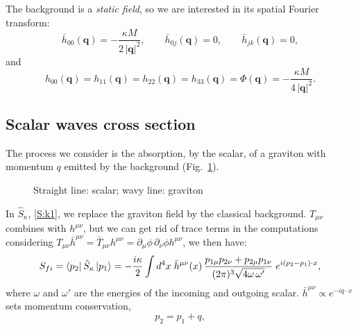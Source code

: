 \documentclass[12pt,a4paper,oneside]{article}
\numberwithin{equation}{section}   %
\begin{document}
The background is a \textit{static field}, so we are interested in its spatial
Fourier transform:
\begin{equation}
    \label{eq:epsilon}
    \bar h_{00}(\mathbf q)=-\frac{\kappa M}{2\,|\mathbf q|^{2}},\qquad
    \bar h_{0j}(\mathbf q)=0,\qquad
    \bar h_{jk}(\mathbf q)=0 ,
\end{equation}
and
\begin{equation}
  \label{eq:Phi}
  h_{00}(\mathbf q)=h_{11}(\mathbf q)=h_{22}(\mathbf q)=h_{33}(\mathbf q)
  =\Phi(\mathbf q)=-\frac{\kappa M}{4\,|\mathbf q|^2}.
\end{equation}

\subsection{Scalar waves cross section}
\label{subsec:amplitude}
The process we consider is the absorption, by the scalar, of a graviton with
momentum $q$ emitted by the background (Fig.~\ref{fig:external-field}).
\begin{figure}[H]
\centering
{}
\caption{Straight line: scalar; wavy
line: graviton}
\label{fig:external-field}
\end{figure}
In $\hat S_\kappa$, \eqref{S:k1}, we replace the graviton field by the classical
background. $T_{\mu\nu}$ combines with
$h^{\mu\nu}$, but we can get rid of trace terms in the computations
considering ${T}_{\mu\nu}\bar h^{\mu\nu}= \bar T_{\mu\nu}h^{\mu\nu}=\partial_\mu\phi\,\partial_\nu\phi h^{\mu\nu}$, we then have:
\begin{equation}
    \label{eq:amplitude}
    S_{fi}=\bra{p_2}\hat S_\kappa\ket{p_1}
    =-\frac{i\kappa}{2}\int d^4x\;\bar h^{\mu\nu}(x)\,
    \frac{p_{1\mu} p_{2\nu}+p_{2\mu} p_{1\nu}}{(2\pi)^3\sqrt{4\omega\,\omega'}}\;
    e^{i(p_2-p_1)\cdot x},
\end{equation}
where $\omega$ and $\omega'$ are the energies of the incoming and outgoing
scalar. $\bar h^{\mu\nu}\propto e^{-iq\cdot x}$ sets
momentum conservation,
\begin{equation}
    \label{eq:momentum-conservation}
    p_2=p_1+q ,
\end{equation}
\end{document}
